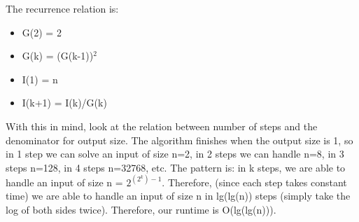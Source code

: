 \documentclass[a4paper]{article}
\begin{document}
The recurrence relation is:
\begin{itemize}
    \item G(2) = 2
    \item G(k) = (G(k-1))$^2$
    \item I(1) = n
    \item I(k+1) = I(k)/G(k)
\end{itemize}

With this in mind, look at the relation between number of steps and the denominator for output size. The algorithm finishes when the output size is 1, so in 1 step we can solve an input of size n=2, in 2 steps we can handle n=8, in 3 steps n=128, in 4 steps n=32768, etc. The pattern is: in k steps, we are able to handle an input of size n = $2^{(2^k)-1}$. Therefore, (since each step takes constant time) we are able to handle an input of size n in lg(lg(n)) steps (simply take the log of both sides twice). Therefore, our runtime is O(lg(lg(n))).
\end{document}

